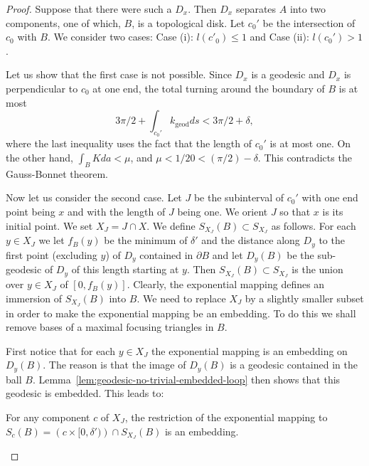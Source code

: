 \begin{proof}
Suppose that there were such a $D_x$. Then $D_x$ separates $A$ into
two components, one of which, $B$, is a topological disk. Let $c_0'$
be the intersection of $c_0$ with $B$. We consider two cases: Case
(i): $l(c'_0)\le 1$ and Case (ii): $l(c_0')>1$.

Let us show that the first case is not possible. Since $D_x$ is a
geodesic and $D_x$ is perpendicular to $c_0$ at one end, the total
turning around the boundary of $B$ is at most
$$3\pi/2+\int_{c_0'}k_\mathrm{geod}ds<3\pi/2+\delta,$$
where the last inequality uses the fact that the length of $c_0'$ is
at most one. On the other hand, $\int_{B}Kda<\mu$, and
$\mu<1/20<(\pi/2)-\delta$. This contradicts the Gauss-Bonnet
theorem.


Now let us consider the second case. Let $J$ be the subinterval of
$c_0'$ with one end point being $x$ and with the length of $J$ being
one. We orient $J$ so that $x$ is its initial point. We set
$X_J=J\cap X$. We define $S_{X_J}(B)\subset S_{X_J}$ as follows. For
each $y\in X_J$ we let $f_B(y)$ be the minimum of $\delta'$ and the
distance along $D_y$ to the first point (excluding $y$) of $D_y$
contained in $\partial B$ and let $D_y(B)$ be the sub-geodesic of
$D_y$ of this length starting at $y$. Then $S_{X_J}(B)\subset
S_{X_J}$ is the union over $y\in X_J$ of $[0,f_B(y)]$.  Clearly, the
exponential mapping defines an immersion of $S_{X_J}(B)$ into $B$.
We need to replace $X_ J$ by a slightly smaller subset in order to
make the exponential mapping be an embedding. To do this we shall
remove bases of a maximal focusing triangles in $B$.

First notice that for each $y\in  X_J$ the exponential mapping is an
embedding on $D_y(B)$. The reason is that the image of $D_y(B)$ is a
geodesic contained in the ball $B$. Lemma~\ref{lem:geodesic-no-trivial-embedded-loop} then shows
that this geodesic is embedded. This leads to:

\begin{claim}
\label{claim:local-embedding-of-geodesic-family}
\label{locemb}
For any component $c$ of $X_J$, the restriction of the exponential
mapping to $S_c(B)=\left(c\times [0,\delta')\right)\cap S_{X_J}(B)$
is an embedding.
\end{claim}


\end{proof}
